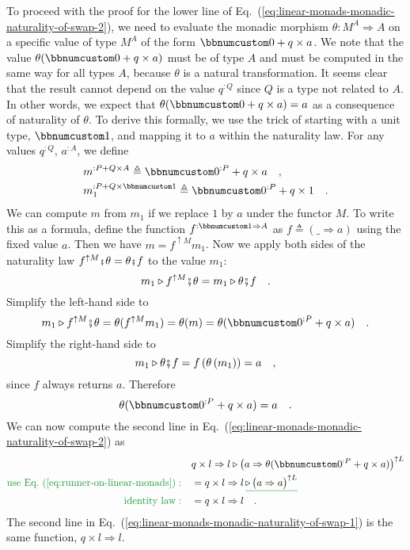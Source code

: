 To proceed with the proof for the lower line of Eq.~(\ref{eq:linear-monads-monadic-naturality-of-swap-2}),
we need to evaluate the monadic morphism $\theta:M^{A}\Rightarrow A$
on a specific value of type $M^{A}$ of the form $\bbnum 0+q\times a$.
We note that the value $\theta(\bbnum 0+q\times a)$ must be of type
$A$ and must be computed in the same way for all types $A$, because
$\theta$ is a natural transformation. It seems clear that the result
cannot depend on the value $q^{:Q}$ since $Q$ is a type not related
to $A$. In other words, we expect that $\theta(\bbnum 0+q\times a)=a$
as a consequence of naturality of $\theta$. To derive this formally,
we use the trick of starting with a unit type, $\bbnum 1$, and mapping
it to $a$ within the naturality law. For any values $q^{:Q}$, $a^{:A}$,
we define 
\begin{align*}
 & m^{:P+Q\times A}\triangleq\bbnum 0^{:P}+q\times a\quad,\\
 & m_{1}^{:P+Q\times\bbnum 1}\triangleq\bbnum 0^{:P}+q\times1\quad.
\end{align*}
We can compute $m$ from $m_{1}$ if we replace $1$ by $a$ under
the functor $M$. To write this as a formula, define the function
$f^{:\bbnum 1\Rightarrow A}$ as $f\triangleq\left(\_\Rightarrow a\right)$
using the fixed value $a$. Then we have $m=f^{\uparrow M}m_{1}$.
Now we apply both sides of the naturality law $f^{\uparrow M}\bef\theta=\theta\bef f$
to the value $m_{1}$:
\[
m_{1}\triangleright f^{\uparrow M}\bef\theta=m_{1}\triangleright\theta\bef f\quad.
\]
Simplify the left-hand side to
\[
m_{1}\triangleright f^{\uparrow M}\bef\theta=\theta(f^{\uparrow M}m_{1})=\theta(m)=\theta(\bbnum 0^{:P}+q\times a)\quad.
\]
Simplify the right-hand side to 
\[
m_{1}\triangleright\theta\bef f=f\left(\theta\left(m_{1}\right)\right)=a\quad,
\]
since $f$ always returns $a$. Therefore 
\begin{equation}
\theta(\bbnum 0^{:P}+q\times a)=a\quad.\label{eq:runner-on-linear-monads}
\end{equation}
We can now compute the second line in Eq.~(\ref{eq:linear-monads-monadic-naturality-of-swap-2})
as
\begin{align*}
 & q\times l\Rightarrow l\triangleright\big(a\Rightarrow\theta(\bbnum 0^{:P}+q\times a)\big)^{\uparrow L}\\
{\color{greenunder}\text{use Eq.~(\ref{eq:runner-on-linear-monads})}:}\quad & =q\times l\Rightarrow l\,\gunderline{\triangleright\,\big(a\Rightarrow a\big)^{\uparrow L}}\\
{\color{greenunder}\text{identity law}:}\quad & =q\times l\Rightarrow l\quad.
\end{align*}
The second line in Eq.~(\ref{eq:linear-monads-monadic-naturality-of-swap-1})
is the same function, $q\times l\Rightarrow l$.

